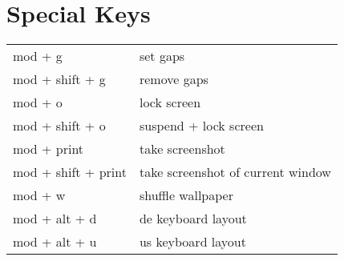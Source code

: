 \documentclass[
    10pt,
    a4paper,
    notitlepage,
]{scrartcl}
\begin{document}
\section{Special Keys}
\begin{tabular}{p{4cm}l}
    mod + g             & set gaps                              \\
    mod + shift + g     & remove gaps                           \\
    mod + o             & lock screen                           \\
    mod + shift + o     & suspend + lock screen                 \\
    mod + print         & take screenshot                       \\
    mod + shift + print & take screenshot of current window     \\
    mod + w             & shuffle wallpaper                     \\
    mod + alt + d       & de keyboard layout                    \\
    mod + alt + u       & us keyboard layout
\end{tabular}
\end{document}
